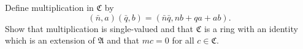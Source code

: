 Define multiplication in $\mathfrak{C}$ by
$$(\bar{n}, a)(\bar{q}, b) = (\bar{n}\bar{q}, nb + qa + ab).$$
Show that multiplication is single-valued and that $\mathfrak{C}$ is a ring with an identity which is an extension of $\mathfrak{A}$ and that $mc = 0$ for all $c \in \mathfrak{C}$.
